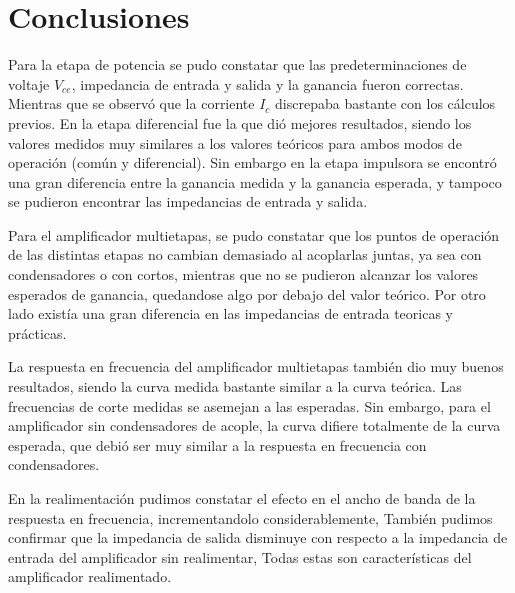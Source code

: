 
\section{Conclusiones}

Para la etapa de potencia se pudo constatar que las predeterminaciones de voltaje $V_{ce}$, impedancia de entrada y salida y la ganancia fueron correctas. Mientras que se observó que la corriente $I_c$ discrepaba bastante con los cálculos previos. En la etapa diferencial fue la que dió mejores resultados, siendo los valores medidos muy similares a los valores teóricos para ambos modos de operación (común y diferencial). Sin embargo en la etapa impulsora se encontró una gran diferencia entre la ganancia medida y la ganancia esperada, y tampoco se pudieron encontrar las impedancias de entrada y salida.

Para el amplificador multietapas, se pudo constatar que los puntos de operación de las distintas etapas no cambian demasiado al acoplarlas juntas, ya sea con condensadores o con cortos, mientras que no se pudieron alcanzar los valores esperados de ganancia, quedandose algo por debajo del valor teórico. Por otro lado existía una gran diferencia en las impedancias de entrada teoricas y prácticas.

La respuesta en frecuencia del amplificador multietapas también dio muy buenos resultados, siendo la curva medida bastante similar a la curva teórica. Las frecuencias de corte medidas se asemejan a las esperadas. Sin embargo, para el amplificador sin condensadores de acople, la curva difiere totalmente de la curva esperada, que debió ser muy similar a la respuesta en frecuencia con condensadores.

En la realimentación pudimos constatar el efecto en el ancho de banda de la respuesta en frecuencia, incrementandolo considerablemente, También pudimos confirmar que la impedancia de salida disminuye con respecto a la impedancia de entrada del amplificador sin realimentar, Todas estas son características del amplificador realimentado. 